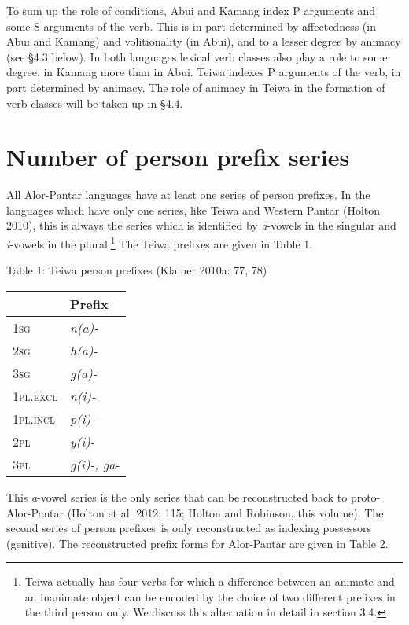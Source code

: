 To sum up the role of conditions, Abui and Kamang index P arguments and some S arguments of the verb. This is in part determined by affectedness (in Abui and Kamang) and volitionality (in Abui), and to a lesser degree by animacy (see {\S}4.3 below). In both languages lexical verb classes also play a role to some degree, in Kamang more than in Abui. Teiwa indexes P arguments of the verb, in part determined by animacy. The role of animacy in Teiwa in the formation of verb classes will be taken up in {\S}4.4.

\clearpage\section[Number of person prefix series]{Number of person prefix series}
All Alor-Pantar languages have at least one series of person prefixes. In the languages which have only one series, like Teiwa and Western Pantar (Holton 2010), this is always the series which is identified by \textit{a}{}-vowels in the singular and \textit{i}{}-vowels in the plural.\footnote{Teiwa actually has four verbs for which a difference between an animate and an inanimate object can be encoded by the choice of two different prefixes in the third person only. We discuss this alternation in detail in section 3.4.} The Teiwa prefixes are given in Table 1.

Table 1: Teiwa person prefixes (Klamer 2010a: 77, 78)

\begin{flushleft}
\tablehead{}
\begin{supertabular}{|m{0.90875983in}|m{0.70945984in}|}
\hline
 &
Prefix\\\hline
\scshape 1sg &
\itshape n(a)-\\\hline
\scshape 2sg &
\itshape h(a)-\\\hline
\scshape 3sg &
\itshape g(a)-\\\hline
\scshape 1pl.excl &
\itshape n(i)-\\\hline
\scshape 1pl.incl &
\itshape p(i)-\\\hline
\scshape 2pl &
\itshape y(i)-\\\hline
\scshape 3pl &
\itshape g(i)-, ga-\\\hline
\end{supertabular}
\end{flushleft}
This \textit{a}{}-vowel series is the only series that can be reconstructed back to proto-Alor-Pantar (Holton et al. 2012: 115; Holton and Robinson, this volume). The second series of person prefixes~is only reconstructed as indexing possessors (genitive). The reconstructed prefix forms for Alor-Pantar are given in Table 2.


